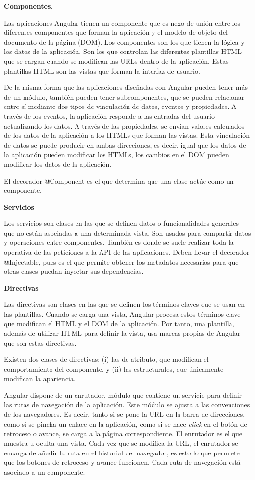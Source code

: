\documentclass[a4paper, 12pt]{book}
\begin{document}
\textbf{Componentes}. 

Las aplicaciones Angular tienen un componente que es nexo de unión entre los diferentes componentes que forman la aplicación y el modelo de objeto del documento de la página (DOM). Los componentes son los que tienen la lógica y los datos de la aplicación. Son los que controlan las diferentes plantillas HTML que se cargan cuando se modifican las URLs dentro de la aplicación. Estas plantillas HTML son las vistas que forman la interfaz de usuario.

De la misma forma que las aplicaciones diseñadas con Angular pueden tener más de un módulo, también pueden tener subcomponentes, que se pueden relacionar entre sí mediante dos tipos de vinculación de datos, eventos y propiedades. A través de los eventos, la aplicación responde a las entradas del usuario actualizando los datos. A través de las propiedades, se envían valores calculados de los datos de la aplicación a los HTMLs que forman las vistas. Esta vinculación de datos se puede producir en ambas direcciones, es decir, igual que los datos de la aplicación pueden modificar los HTMLs, los cambios en el DOM pueden modificar los datos de la aplicación.

El decorador @Component es el que determina que una clase actúe como un componente. 

\textbf{Servicios}

Los servicios son clases en las que se definen datos o funcionalidades generales que no están asociadas a una determinada vista. Son usados para compartir datos y operaciones entre componentes. También es donde se suele realizar toda la operativa de las peticiones a la API de las aplicaciones. Deben llevar el decorador @Injectable, pues es el que permite obtener los metadatos necesarios para que otras clases puedan inyectar sus dependencias. 

\textbf{Directivas}

Las directivas son clases en las que se definen los términos claves que se usan en las plantillas. Cuando se carga una vista, Angular procesa estos términos clave que modifican el HTML y el DOM de la aplicación. Por tanto, una plantilla, además de utilizar HTML para definir la vista, usa marcas propias de Angular que son estas directivas. 

Existen dos clases de directivas: (i) las de atributo, que modifican el comportamiento del componente, y (ii) las estructurales, que únicamente modifican la apariencia. 

Angular dispone de un enrutador, módulo que contiene un servicio para definir las rutas de navegación de la aplicación. Este módulo se ajusta a las convenciones de los navegadores. Es decir, tanto si se pone la URL en la barra de direcciones, como si se pincha un enlace en la aplicación, como si se hace \emph{click} en el botón de retroceso o avance, se carga a la página correspondiente. El enrutador es el que muestra u oculta una vista. Cada vez que se modifica la URL, el enrutador se encarga de añadir la ruta en el historial del navegador, es esto lo que permiete que los botones de retroceso y avance funcionen. Cada ruta de navegación está asociado a un componente. 
\end{document}
